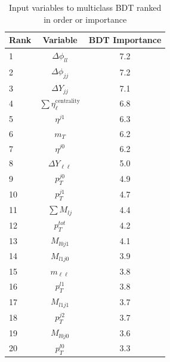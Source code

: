 \begin{table}[h!]
\centering
\begin{tabular}{|l|c|c|}
\hline
Rank &	Variable  & BDT Importance \\
\hline
1 &  $\Delta \phi_{ll}$ & 7.2    \\
2 &  $\Delta \phi_{jj}$ &  7.2\\
3 &  $\Delta Y_{jj}$   & 7.1    \\
4 &  $\sum\eta_\ell^{\mathrm{centrality}}$ & 6.8   \\
5 &  $\eta^{j1}$ &  6.3  \\
6 &  $m_T$     &  6.2  \\
7 &  $\eta^{j0}$ &  6.2  \\
8 &  $\Delta Y_{\ell\ell}$   & 5.0   \\
9 &  $p_T^{j0}$  & 4.9   \\
10  & $p_T^{j1}$ & 4.7   \\
11  & $\sum M_{lj}$& 4.4   \\
12  & $p_T^{tot}$ & 4.2   \\
13  & $M_{l0j1}$& 4.1   \\
14  & $M_{l1j0}$& 3.9   \\
15  & $m_{\ell\ell}$   & 3.8   \\
16  & $p_T^{l1}$  & 3.8   \\
17  & $M_{l1j1}$& 3.7   \\
18  & $p_T^{j2}$  & 3.7   \\
19  & $M_{l0j0}$& 3.6   \\
20  & $p_T^{l0}$  & 3.3   \\ 
\hline
\end{tabular}
\caption{Input variables to multiclass BDT ranked in order or importance}
\label{tab:rankingmulti}
\end{table}

